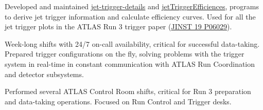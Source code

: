 
\begin{cventries}
    {Developed and maintained \href{https://gitlab.cern.ch/atlas-trigger/jet/jet-trigger-details}{jet-trigger-details} and \href{https://gitlab.cern.ch/atlas-trigger/jet/jetTriggerEfficiencies/-/tree/R22-master}{jetTriggerEfficiences}, programs to derive jet trigger information and calculate efficiency curves. Used for all the jet trigger plots in the ATLAS Run 3 trigger paper (\href{https://doi.org/10.1088/1748-0221/19/06/P06029}{JINST 19 P06029}).}

    {Week-long shifts with 24/7 on-call availability, critical for successful data-taking. Prepared trigger configurations on the fly, solving problems with the trigger system in real-time in constant communication with ATLAS Run Coordination and detector subsystems.}

    {Performed several ATLAS Control Room shifts, critical for Run 3 preparation and data-taking operations. Focused on Run Control and Trigger desks.}

\end{cventries}